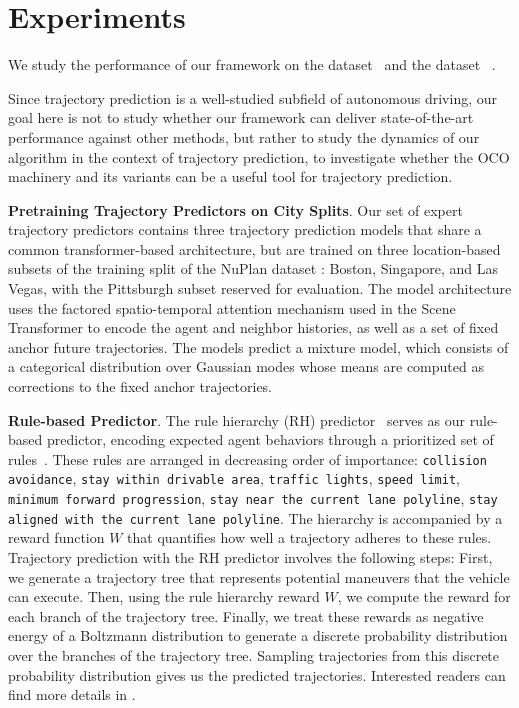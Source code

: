 \section{Experiments}
\label{sec:experiment}

We study the performance of our framework on the \nuscenes dataset~\cite{caesar2020nuscenes} and the \lyft dataset ~\cite{houston2021one}.

Since trajectory prediction is a well-studied subfield of autonomous driving, our goal here is not to study whether our framework can deliver state-of-the-art performance against other methods, but rather to study the dynamics of our algorithm in the context of trajectory prediction, \ie to investigate whether the OCO machinery and its variants can be a useful tool for trajectory prediction.

{\bf Pretraining Trajectory Predictors on City Splits}. 
Our set of expert trajectory predictors contains three trajectory prediction models that share a common transformer-based architecture, but are trained on three location-based subsets of the training split of the NuPlan dataset \cite{caesar2022nuplan}: Boston, Singapore, and Las Vegas, with the Pittsburgh subset reserved for evaluation. The model architecture uses the factored spatio-temporal attention mechanism used in the Scene Transformer \cite{ngiam2021scene} to encode the agent and neighbor histories, as well as a set of fixed anchor future trajectories. The models predict a mixture model, which consists of a categorical distribution over Gaussian modes whose means are computed as corrections to the fixed anchor trajectories.

{\bf Rule-based Predictor}.
The rule hierarchy (RH) predictor~\cite[Section IV.A]{patrikar2024rulefuser} serves as our rule-based predictor, encoding expected agent behaviors through a prioritized set of rules~\cite{veer23icra-receding}. These rules are arranged in decreasing order of importance: \texttt{collision avoidance}, \texttt{stay within drivable area}, \texttt{traffic lights}, \texttt{speed limit}, \texttt{minimum forward progression}, \texttt{stay near the current lane polyline}, \texttt{stay aligned with the current lane polyline}. The hierarchy is accompanied by a reward function $W$ that quantifies how well a trajectory adheres to these rules.
Trajectory prediction with the RH predictor involves the following steps: First, we generate a trajectory tree that represents potential maneuvers that the vehicle can execute. Then, using the rule hierarchy reward $W$, we compute the reward for each branch of the trajectory tree. Finally, we treat these rewards as negative energy of a Boltzmann distribution to generate a discrete probability distribution over the branches of the trajectory tree. Sampling trajectories from this discrete probability distribution gives us the predicted trajectories. 
Interested readers can find more details in \cite{patrikar2024rulefuser}.

